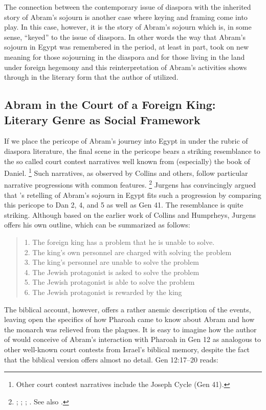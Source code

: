 The connection between the contemporary issue of diaspora with the inherited story of Abram's sojourn is another case where keying and framing come into play. In this case, however, it is the story of Abram's sojourn which is, in some sense, ``keyed'' to the issue of diaspora. In other words the way that Abram's sojourn in Egypt was remembered in the \secondtemple period, at least in part, took on new meaning for those sojourning in the diaspora and for those living in the land under foreign hegemony and this reinterpretation of Abram's activities shows through in the literary form that the author of \ga utilized.

\subsection{Abram in the Court of a Foreign King: Literary Genre as Social Framework}

If we place the pericope of Abram's journey into Egypt in \ga under the rubric of diaspora literature, the final scene in the pericope bears a striking resemblance to the so called court contest narratives well known from (especially) the book of Daniel.%
    \footnote{Other court contest narratives include the Joseph Cycle (Gen 41).}
Such narratives, as observed by Collins and others, follow particular narrative progressions with common features.%
    \footnote{\Cite[38--52]{collins1993}; \cite{humphreys_jbl1973}; \cite{collins_jbl1975}; \cite{wills1990}. See also \cite{niditch-doran_jbl1977}.}
Jurgens has convincingly argued that \ga's retelling of Abram's sojourn in Egypt fits such a progression by comparing this pericope to Dan 2, 4, and 5 as well as Gen 41. The resemblance is quite striking. Although based on the earlier work of Collins and Humprheys, Jurgens offers his own outline, which can be summarized as follows:%
    \autocite[21]{jurgens_jsj2018}
\begin{quote}
    1. The foreign king has a problem that he is unable to solve.\\
    2. The king's own personnel are charged with solving the problem\\
    3. The king's personnel are unable to solve the problem\\
    4. The Jewish protagonist is asked to solve the problem\\
    5. The Jewish protagonist is able to solve the problem\\
    6. The Jewish protagonist is rewarded by the king
\end{quote}
\noindent
The biblical account, however, offers a rather anemic description of the events, leaving open the specifics of how Pharoah came to know about Abram and how the monarch was relieved from the plagues. It is easy to imagine how the author of \ga would conceive of Abram's interaction with Pharoah in Gen 12 as analogous to other well-known court contests from Israel's biblical memory, despite the fact that the biblical version offers almost no detail. Gen 12:17--20 reads: 

